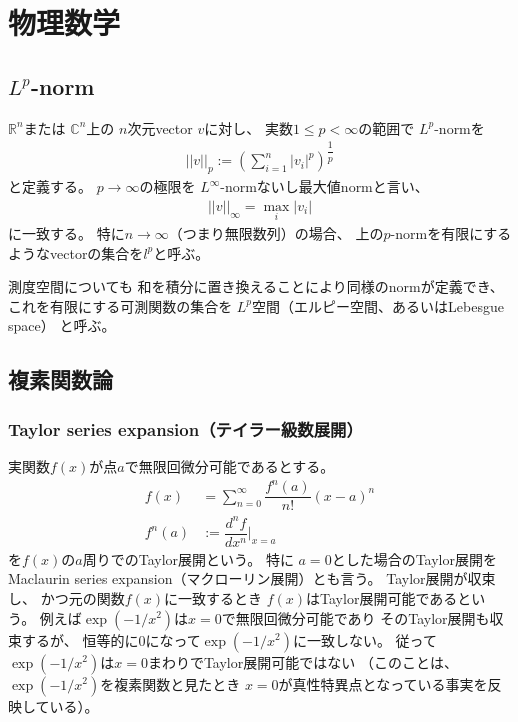 \appendix
\renewcommand{\theequation}{A.\arabic{section}.\arabic{equation}}
\setcounter{equation}{0}

\section{物理数学}

\subsection{$L^p$-norm}

$\mathbb{R}^n$または
$\mathbb{C}^n$上の
$n$次元vector $v$に対し、
実数$1\le p < \infty$の範囲で
$L^p$-normを
\begin{align}
    ||v||_p
:=
    \left(
        \sum_{i=1}^n
        |v_i|^p
    \right)^{ \dfrac{1}{p} }
\end{align}
と定義する。
$p\to\infty$の極限を
$L^\infty$-normないし最大値normと言い、
\begin{align}
    ||v||_\infty
=
    \max_i
    |v_i|
\end{align}
に一致する。
特に$n \to \infty$（つまり無限数列）の場合、
上の$p$-normを有限にするようなvectorの集合を$l^p$と呼ぶ。

測度空間についても
和を積分に置き換えることにより同様のnormが定義でき、
これを有限にする可測関数の集合を
$L^p$空間（エルピー空間、あるいはLebesgue space）
と呼ぶ。

\subsection{複素関数論}

\subsubsection{Taylor series expansion（テイラー級数展開）}

実関数$f(x)$が点$a$で無限回微分可能であるとする。
\begin{subequations}
\begin{align}
    f(x)
    &=
    \sum_{n=0}^{\infty}
    \dfrac{ f^{n}(a) }{n!}
    (x-a)^n
\label{Taylor series expansion}
\\
    f^{n}(a)
    &:=
    \dfrac{d^nf}{dx^n}\bigg|_{x=a}
\end{align}
\end{subequations}
を$f(x)$の$a$周りでのTaylor展開という。
特に
$a=0$とした場合のTaylor展開を
Maclaurin series expansion（マクローリン展開）とも言う。
Taylor展開が収束し、
かつ元の関数$f(x)$に一致するとき
$f(x)$はTaylor展開可能であるという。
例えば$\exp(-1/x^2)$は$x=0$で無限回微分可能であり
そのTaylor展開も収束するが、
恒等的に$0$になって$\exp(-1/x^2)$に一致しない。
従って$\exp(-1/x^2)$は$x=0$まわりでTaylor展開可能ではない
（このことは、$\exp(-1/x^2)$を複素関数と見たとき
$x=0$が真性特異点となっている事実を反映している）。

